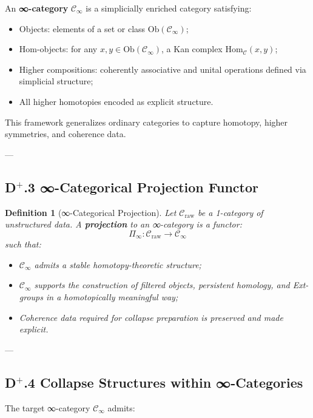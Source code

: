 \documentclass[11pt]{article}
\newtheorem{definition}[theorem]{Definition}
\begin{document}
An \textbf{∞-category} $\mathcal{C}_\infty$ is a simplicially enriched category satisfying:

\begin{itemize}
    \item Objects: elements of a set or class $\mathrm{Ob}(\mathcal{C}_\infty)$;
    \item Hom-objects: for any $x, y \in \mathrm{Ob}(\mathcal{C}_\infty)$, a Kan complex $\mathrm{Hom}_\mathcal{C}(x, y)$;
    \item Higher compositions: coherently associative and unital operations defined via simplicial structure;
    \item All higher homotopies encoded as explicit structure.
\end{itemize}

This framework generalizes ordinary categories to capture homotopy, higher symmetries, and coherence data.

---

\subsection*{D$^{+}$.3 ∞-Categorical Projection Functor}

\begin{definition}[∞-Categorical Projection]
Let $\mathcal{C}_{\mathrm{raw}}$ be a 1-category of unstructured data. A \textbf{projection} to an ∞-category is a functor:
\[
\Pi_\infty : \mathcal{C}_{\mathrm{raw}} \longrightarrow \mathcal{C}_\infty
\]
such that:

\begin{itemize}
    \item $\mathcal{C}_\infty$ admits a stable homotopy-theoretic structure;
    \item $\mathcal{C}_\infty$ supports the construction of filtered objects, persistent homology, and Ext-groups in a homotopically meaningful way;
    \item Coherence data required for collapse preparation is preserved and made explicit.
\end{itemize}
\end{definition}

---

\subsection*{D$^{+}$.4 Collapse Structures within ∞-Categories}

The target ∞-category $\mathcal{C}_\infty$ admits:
\end{document}
